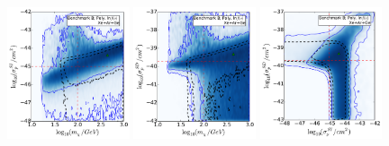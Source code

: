 \begin{figure}[!ht]
  \includegraphics[width=0.32\textwidth]{NT/BenchmarkB_poly_noIC-mx_sigsi.pdf}
  \includegraphics[width=0.32\textwidth]{NT/BenchmarkB_poly_noIC-mx_sigsd.pdf}
  \includegraphics[width=0.32\textwidth]{NT/BenchmarkB_poly_noIC-sigsi_sigsd.pdf}


\end{figure}
